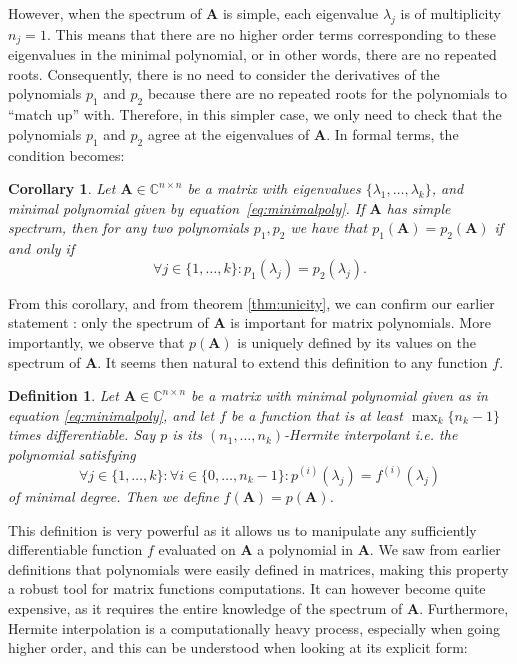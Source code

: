 \documentclass[11pt]{article}
\newtheorem{definition}{Definition}[section]
\newtheorem{corollary}{Corollary}[theorem]
\numberwithin{equation}{section}
\begin{document}
However, when the spectrum of $\mathbf{A}$ is simple, each eigenvalue $\lambda_j$ is of multiplicity $n_j=1$. This means that there are no higher order terms corresponding to these eigenvalues in the minimal polynomial, or in other words, there are no repeated roots. Consequently, there is no need to consider the derivatives of the polynomials $p_1$ and $p_2$ because there are no repeated roots for the polynomials to ``match up'' with. Therefore, in this simpler case, we only need to check that the polynomials $p_1$ and $p_2$ agree at the eigenvalues of $\mathbf{A}$. In formal terms, the condition becomes:
\begin{corollary}\label{cor:unicity}
Let $\mathbf{A}\in \mathbb{C}^{n\times n}$ be a matrix with eigenvalues $\{\lambda_1,\ldots,\lambda_k\}$, and minimal polynomial given by equation~\ref{eq:minimalpoly}. If $\mathbf{A}$ has simple spectrum, then for any two polynomials $p_1,p_2$ we have that $p_1(\mathbf{A})=p_2(\mathbf{A})$ if and only if
\begin{equation*}
    \forall j\in\{1,\ldots,k\}: p_1(\lambda_j)=p_2(\lambda_j).
\end{equation*}
\end{corollary}
From this corollary, and from theorem \ref{thm:unicity}, we can confirm our earlier statement : only the spectrum of $\mathbf{A}$ is important for matrix polynomials. More importantly, we observe that $p(\mathbf{A})$ is uniquely defined by its values on the spectrum of $\mathbf{A}$. It seems then natural to extend this definition to any function $f$.
\begin{definition}\label{def:Hermite}
    Let $\mathbf{A}\in\mathbb{C}^{n\times n}$ be a matrix with minimal polynomial given as in equation \ref{eq:minimalpoly}, and let $f$ be a function that is at least $\max_k\{n_k-1\}$ times differentiable. Say $p$ is its $(n_1,\ldots,n_k)$-\emph{Hermite interpolant} i.e. the polynomial satisfying
    $$\forall j\in\{1,\ldots,k\}:\forall i\in\{0,\ldots,n_k-1\}: p^{(i)}(\lambda_j)=f^{(i)}(\lambda_j)$$
    of minimal degree. Then we define $f(\mathbf{A})=p(\mathbf{A})$.
\end{definition}
This definition is very powerful as it allows us to manipulate any sufficiently differentiable function $f$ evaluated on $\mathbf{A}$ a polynomial in $\mathbf{A}$. We saw from earlier definitions that polynomials were easily defined in matrices, making this property a robust tool for matrix functions computations. It can however become quite expensive, as it requires the entire knowledge of the spectrum of $\mathbf{A}$. Furthermore, Hermite interpolation is a computationally heavy process, especially when going higher order, and this can be understood when looking at its explicit form:
\end{document}
